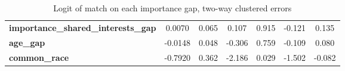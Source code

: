 \begin{table}[htbp]
\begin{center}
\begin{tabular}{lcccccc}
\textbf{importance\_shared\_interests\_gap} &       0.0070  &        0.065     &     0.107  &         0.915        &       -0.121    &        0.135     \\
\textbf{age\_gap}                           &      -0.0148  &        0.048     &    -0.306  &         0.759        &       -0.109    &        0.080     \\
\textbf{common\_race}                       &      -0.7920  &        0.362     &    -2.186  &         0.029        &       -1.502    &       -0.082     \\
\bottomrule
\end{tabular}
\end{center}
\caption{Logit of match on each importance gap, two-way clustered errors}
\label{tab:q7_logit_alt}
\end{table}
